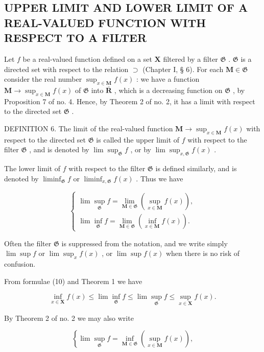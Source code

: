\subsection{UPPER LIMIT AND LOWER LIMIT OF A REAL-VALUED FUNCTION WITH RESPECT TO A FILTER}

Let \(f\) be a real-valued function defined on a set \(\mathbf{X}\) filtered by a filter \(\mathfrak{G}\) . \(\mathfrak{G}\) is a directed set with respect to the relation \(\supset\) (Chapter I, § 6). For each \(\mathbf{M} \in \mathfrak{G}\) consider the real number \(\sup_{x \in \mathbf{M}} f(x)\) : we have a function \(\mathbf{M} \to \sup_{x \in \mathbf{M}} f(x)\) of \(\mathfrak{G}\) into \(\overline{\mathbf{R}}\) , which is a decreasing function on \(\mathfrak{G}\) , by Proposition 7 of no. 4. Hence, by Theorem 2 of no. 2, it has a limit with respect to the directed set \(\mathfrak{G}\) .

DEFINITION 6. The limit of the real-valued function \(\mathbf{M} \to \sup_{x \in \mathbf{M}} f(x)\) with respect to the directed set \(\mathfrak{G}\) is called the upper limit of \(f\) with respect to the filter \(\mathfrak{G}\) , and is denoted by \(\lim \sup_{\mathfrak{G}} f\) , or by \(\lim \sup_{x, \mathfrak{G}} f(x)\) .

The lower limit of \(f\) with respect to the filter \(\mathfrak{G}\) is defined similarly, and is denoted by \(\liminf_{\mathfrak{G}} f\) or \(\liminf_{x, \mathfrak{G}} f(x)\) . Thus we have

\[
\left\{ \begin{array}{l} \lim \sup_{\mathfrak{G}} f = \lim_{\mathbf {M} \in \mathfrak {G}}(\sup_{x \in \mathbf {M}}f(x)), \\ \lim \inf_{\mathfrak{G}} f = \lim_{\mathbf {M} \in \mathfrak {G}}(\inf_{x \in \mathbf {M}}f(x)). \end{array} \right.\tag{10}
\]

Often the filter \(\mathfrak{G}\) is suppressed from the notation, and we write simply \(\lim \sup f\) or \(\lim \sup_x f(x)\) , or \(\lim \sup f(x)\) when there is no risk of confusion.

From formulae (10) and Theorem 1 we have

\[
\inf _ {x \in \mathbf {X}} f (x) \leqslant \lim \inf _ {\mathfrak {G}} f \leqslant \lim \sup _ {\mathfrak {G}} f \leqslant \sup _ {x \in \mathbf {X}} f (x).\tag{11}
\]

By Theorem 2 of no. 2 we may also write

\[
\left\{\lim \sup _ {\mathfrak {G}} f = \inf _ {\mathbf {M} \in \mathfrak {G}} (\sup _ {x \in \mathbf {M}} f (x)), \right.\tag{12}
\]

